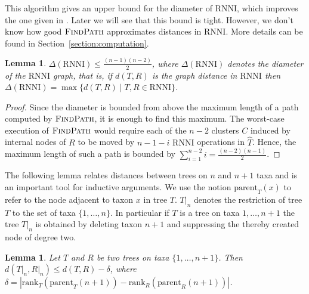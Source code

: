 \documentclass{amsart}
\newcommand{\parent}{\mathrm{parent}}
\newcommand{\rank}{\mathrm{rank}}
\newcommand{\rnni}{\mathrm{RNNI}}
\newcommand{\findpath}{\textsc{FindPath}}
\newtheorem{lemma}[definition]{Lemma}
\begin{document}
This algorithm gives an upper bound for the diameter of $\rnni$, which
improves
the one given in \autocite{Gavryushkin2018-ol}.
Later we will see that this bound is tight.
However, we don't know how good $\findpath$ approximates distances in $\rnni$. 
More details can be found in Section~\ref{section:computation}.

\begin{lemma}
$\Delta(\rnni) \leq \frac{(n-1)(n-2)}{2}$, where $\Delta(\rnni)$ denotes the diameter of the $\rnni$ graph, that is, if $d(T, R)$ is the graph distance in $\rnni$ then $\Delta(\rnni) = \max \{d(T, R) \mid T, R \in \rnni\}$.
\label{lemma:diameter_bound}
\end{lemma}

\begin{proof}
Since the diameter is bounded from above the maximum length of a path computed by $\findpath$, it is enough to find this maximum.
The worst-case execution of $\findpath$ would require each of the $n-2$ clusters $C$ induced by internal nodes of $R$ to be moved by $n - 1 - i$ $\rnni$ operations in $\hat{T}$.
Hence, the maximum length of such a path is bounded by $\sum\limits_{i = 1}^{n-2} i = \frac{(n-2)(n-1)}{2}$.
\end{proof}

The following lemma relates distances between trees on $n$ and $n+1$ taxa and is an important tool for inductive arguments.
We use the notion $\parent_T(x)$ to refer to the node adjacent to taxon $x$ in tree $T$.
$T{\big|}_n$ denotes the restriction of tree $T$ to the set of taxa $\{1, \ldots, n\}$.
In particular if $T$ is a tree on taxa $1, \ldots, n+1$ the tree $T{\big|}_n$ is obtained by deleting taxon $n+1$ and suppressing the thereby created node of degree two.

\begin{lemma}
Let $T$ and $R$ be two trees on taxa $\{1, \ldots, n+1\}$.
Then $d(T{\big|}_n, R{\big|}_n) \leq d(T,R) - \delta$, where $\delta = |\rank_T(\parent_T(n+1)) - \rank_R(\parent_R(n+1))|$.
\label{lemma:distance_delete_taxon}
\end{lemma}
\end{document}
